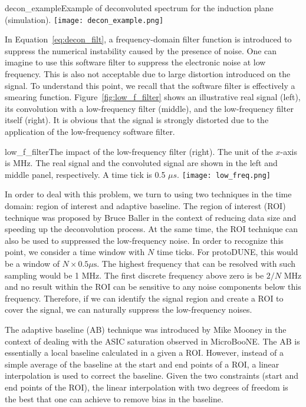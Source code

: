 \begin{cdrfigure}{decon_example}{Example of deconvoluted spectrum for the induction plane (simulation).}
\texttt{[image: decon\_example.png]}
\end{cdrfigure}


In Equation~\eqref{eq:decon_filt}, a frequency-domain  filter function is introduced 
to suppress the numerical instability caused by the presence of noise. One can imagine to use this
software filter to suppress the electronic noise at low frequency. This is also 
not acceptable due to large distortion introduced on the signal. To understand this 
point, we recall that the software filter is effectively a smearing function. 
Figure~\ref{fig:low_f_filter} shows an illustrative real signal (left), its convolution 
with a low-frequency filter (middle), and the low-frequency filter itself (right). 
It is obvious that the signal is strongly distorted due to the application of the 
low-frequency software filter. 

\begin{cdrfigure}{low_f_filter}{The impact of the low-frequency filter (right). The unit of the $x$-axis 
is MHz.  The real signal and the convoluted signal are shown in the left and
middle panel, respectively. A time tick is 0.5 $\mu s$.}
\texttt{[image: low\_freq.png]}
\end{cdrfigure}

In order to deal with this problem, we turn to using two techniques in the time domain: 
region of interest and adaptive baseline. The region of interest (ROI) technique
was proposed by Bruce Baller in the context of reducing data size and speeding up the 
deconvolution process. At the same time, the ROI technique can also be used to 
suppressed the low-frequency noise. In order to recognize this point, we consider
a time window with $N$ time ticks.  For protoDUNE, this would be a window of 
$N\times0.5\mu\mbox{s}$. The highest frequency that can be resolved with such 
sampling would be 1 MHz. The first discrete frequency above zero is be $2/N$ MHz 
and no result within the ROI can be sensitive to any noise components below this 
frequency.  Therefore, if we can identify the signal region and create a ROI to 
cover the signal, we can naturally suppress the low-frequency noises. 

The adaptive baseline (AB) technique was introduced by Mike Mooney in the context of 
dealing with the ASIC saturation observed in MicroBooNE. The AB is essentially a 
local baseline calculated in a given a ROI. However, instead of a simple average of 
the baseline at the start and end points of a ROI, a linear interpolation is used to 
correct the baseline. Given the two constraints (start and end points of the ROI), 
the linear interpolation with two degrees of freedom is the best that one can achieve 
to remove bias in the baseline. 

